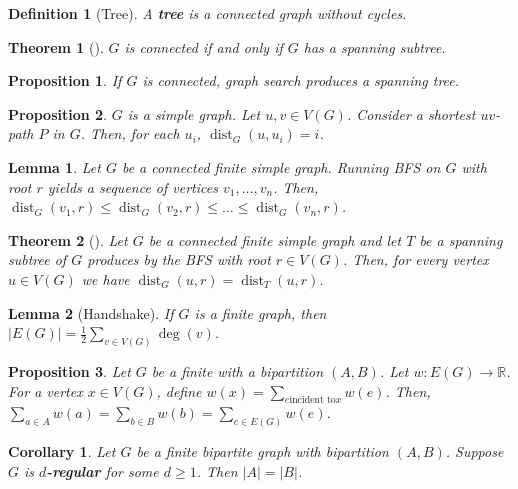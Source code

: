 \documentclass{article}
\newcommand{\R}{\mathbb{R}}
\newcommand{\size}[1]{|#1|}
\DeclareMathOperator*{\dist}{dist}
\newtheorem*{definition}{Definition}
\newtheorem*{proposition}{Proposition}
\newtheorem*{lemma}{Lemma}
\newtheorem*{theorem}{Theorem}
\newtheorem*{corollary}{Corollary}
\begin{document}
\begin{definition}[Tree]
    A \textbf{tree} is a connected graph without cycles.
\end{definition}

\begin{theorem}[]
    $ G $ is connected if and only if $ G $ has a spanning subtree.
\end{theorem}

\begin{proposition}
    If $ G $ is connected, graph search produces a spanning tree.
\end{proposition}

\begin{proposition}
    $ G $ is a simple graph. Let $ u,v \in V(G) $. Consider a shortest $ uv $-path $ P $ in $ G $.
    Then, for each $ u_i $, $ \dist_G(u, u_i) = i $.
\end{proposition}

\begin{lemma}
    Let $ G $ be a connected finite simple graph. Running BFS on $ G $ with root $ r $ yields a sequence of vertices $ v_1, \dots, v_n $.
    Then, $ \dist_G(v_1, r) \leq \dist_G(v_2, r) \leq \dots \leq \dist_G(v_n, r)$.
\end{lemma}

\begin{theorem}[]
    Let $ G $ be a connected finite simple graph and let $ T $ be a spanning subtree of $ G $ produces by the BFS with root $ r \in V(G) $.
    Then, for every vertex $ u \in V(G) $ we have $ \dist_G(u,r) = \dist_T(u,r) $.
\end{theorem}

\begin{lemma}[Handshake]
    If $ G $ is a finite graph, then $ \size{E(G)} = \frac{1}{2}\sum_{v \in V(G)}\deg(v) $.
\end{lemma}

\begin{proposition}
    Let $ G $ be a finite with a bipartition $ (A,B) $. Let $ w: E(G) \to \R $. For a vertex $ x \in V(G) $, define
    $ w(x) = \sum_{e \text{incident to} x} w(e)$. Then, $ \sum_{a \in A}^{}w(a) = \sum_{b \in B}^{}w(b) = \sum_{e \in E(G)}^{} w(e) $.
\end{proposition}

\begin{corollary}
    Let $ G $ be a finite bipartite graph with bipartition $ (A,B) $. Suppose $ G $ is \textbf{$d$-regular} for some $ d \geq 1 $.
    Then $ \size{A} = \size{B} $.
\end{corollary}
\end{document}
